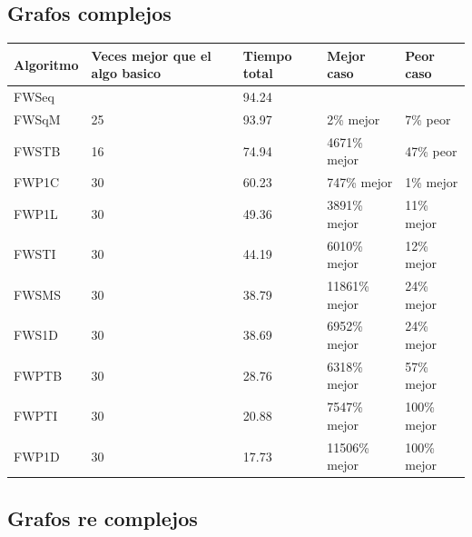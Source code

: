\documentclass[a4paper,11pt]{article}
\begin{document}
\subsection{Grafos complejos}

\begin{center}
  \begin{tabular}{p{2cm} | p{4.5cm} | p{2cm} | p{3cm} | p{3cm}}
    \centering \textbf{Algoritmo} & \centering \textbf {Veces mejor que el algo basico} & \centering \textbf{Tiempo total} & \centering \textbf{Mejor caso} & \centering \textbf{Peor caso} \tabularnewline
    \hline
    FWSeq & & 94.24 & & \\
    \hline
    \hline
    FWSqM & 25 & 93.97 & 2\% mejor & 7\% peor \\
    \hline
    FWSTB & 16 & 74.94 & 4671\% mejor & 47\% peor \\
    \hline
    FWP1C & 30 & 60.23 & 747\% mejor & 1\% mejor \\
    \hline
    FWP1L & 30 & 49.36 & 3891\% mejor & 11\% mejor \\
    \hline
    FWSTI & 30 & 44.19 & 6010\% mejor & 12\% mejor \\
    \hline
    FWSMS & 30 & 38.79 & 11861\% mejor & 24\% mejor \\
    \hline
    FWS1D & 30 & 38.69 & 6952\% mejor & 24\% mejor \\
    \hline
    FWPTB & 30 & 28.76 & 6318\% mejor & 57\% mejor \\
    \hline
    FWPTI & 30 & 20.88 & 7547\% mejor & 100\% mejor \\
    \hline
    FWP1D & 30 & 17.73 & 11506\% mejor & 100\% mejor \\
    \hline
  \end{tabular}
\end{center}

\subsection{Grafos re complejos}
\end{document}
